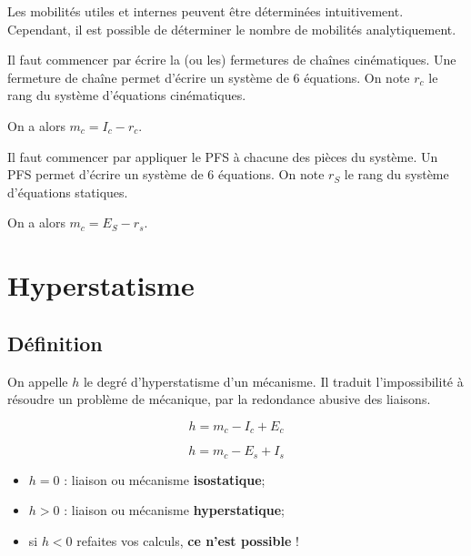 Les mobilités utiles et internes peuvent être déterminées intuitivement. Cependant, il est possible de déterminer le nombre de mobilités analytiquement. 


\begin{multicols}{2}
\begin{methode}

Il faut commencer par écrire la (ou les) fermetures de chaînes cinématiques. Une fermeture de chaîne permet d'écrire un système de 6 équations. On note $r_c$ le rang du système d'équations cinématiques.

On a alors $m_c = I_c -r_c$.   
\end{methode}

\begin{methode}

Il faut commencer par appliquer le PFS à chacune des pièces du système. Un PFS permet d'écrire un système de 6 équations. On note $r_S$ le rang du système d'équations statiques.

On a alors $m_c =E_S - r_s$.   
\end{methode}
\end{multicols}
		
\section{Hyperstatisme}
\subsection{Définition}
On appelle $h$ le degré d'hyperstatisme d'un mécanisme.
Il traduit l'impossibilité à résoudre un problème de mécanique, par la redondance abusive des liaisons.
			
\begin{multicols}{2}
\begin{methode}[en cinématique]
$$
h=m_c-I_c+E_c
$$
\end{methode}
\begin{methode}[en statique]

$$
h=m_c-E_s+I_s
$$
\end{methode}
\end{multicols}

\begin{itemize}
\item $h=0$ : liaison ou mécanisme \textbf{isostatique};
\item $h>0$ : liaison ou mécanisme \textbf{hyperstatique};
\item si $h<0$ refaites vos calculs, \textbf{ce n'est possible} !  
\end{itemize}







